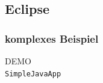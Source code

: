 \documentclass{beamer}
\begin{document}
  \subsection{Eclipse}
  \begin{frame}\frametitle{komplexes Beispiel}
    \centering
    \Huge{DEMO}\\
    \centering
    \normalsize{\texttt{SimpleJavaApp}}\\
  \end{frame}

%
\end{document}
